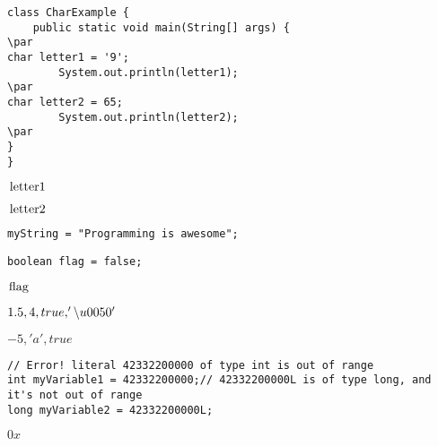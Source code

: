 \documentclass{book}
\def\lthtmlcheckvsize{\ifdim\ht\sizebox<\vsize 
  \ifdim\wd\sizebox<\hsize\expandafter\hfill\fi \expandafter\vfill
  \else\expandafter\vss\fi}%
\begin{document}
{\newpage\clearpage
{}%
\begin{lstlisting}
class CharExample {
    public static void main(String[] args) {
\par
char letter1 = '9';
        System.out.println(letter1);
\par
char letter2 = 65;
        System.out.println(letter2);
\par
}
}
\end{lstlisting}%
\lthtmlfigureZ
\lthtmlcheckvsize\clearpage}

{\newpage\clearpage
{}%
$\lstinline{letter1}$%
\lthtmlindisplaymathZ
\lthtmlcheckvsize\clearpage}

{\newpage\clearpage
{}%
$\lstinline{letter2}$%
\lthtmlindisplaymathZ
\lthtmlcheckvsize\clearpage}

{\newpage\clearpage
{}%
\begin{lstlisting}
myString = "Programming is awesome";
\end{lstlisting}%
\lthtmlfigureZ
\lthtmlcheckvsize\clearpage}

{\newpage\clearpage
{}%
\begin{lstlisting}
boolean flag = false;
\end{lstlisting}%
\lthtmlfigureZ
\lthtmlcheckvsize\clearpage}

{\newpage\clearpage
{}%
$\lstinline{flag}$%
\lthtmlindisplaymathZ
\lthtmlcheckvsize\clearpage}

{\newpage\clearpage
{}%
$1.5, 4, true, '\symbol{92}u0050'$%
\lthtmlindisplaymathZ
\lthtmlcheckvsize\clearpage}

{\newpage\clearpage
{}%
$-5, 'a', true$%
\lthtmlindisplaymathZ
\lthtmlcheckvsize\clearpage}

{\newpage\clearpage
{}%
\begin{lstlisting}
// Error! literal 42332200000 of type int is out of range
int myVariable1 = 42332200000;// 42332200000L is of type long, and it's not out of range
long myVariable2 = 42332200000L;
\end{lstlisting}%
\lthtmlfigureZ
\lthtmlcheckvsize\clearpage}

{\newpage\clearpage
{}%
$0x$%
\lthtmlindisplaymathZ
\lthtmlcheckvsize\clearpage}
\end{document}
